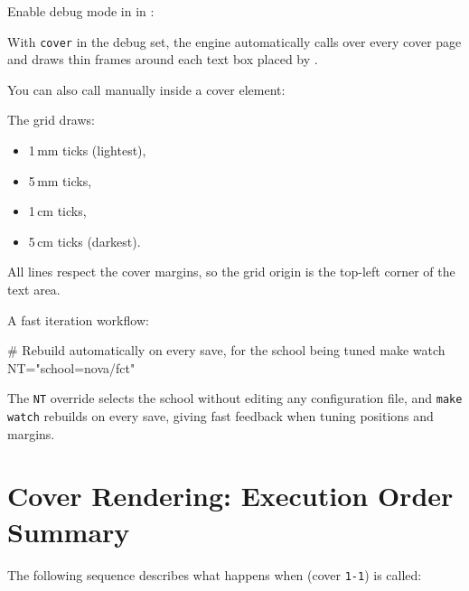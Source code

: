 Enable debug mode in \latexinline{\ntsetup} in :

\begin{latexcode}
\end{latexcode}

With \texttt{cover} in the debug set, the engine automatically calls
\latexinline{\debuggrid} over every cover page and draws thin frames around each
text box placed by \latexinline{\ntaddtocover}.

You can also call \latexinline{\debuggrid} manually inside a cover element:
\begin{latexcode}
\end{latexcode}

The grid draws:
\begin{itemize}
  \item 1\,mm ticks (lightest),
  \item 5\,mm ticks,
  \item 1\,cm ticks,
  \item 5\,cm ticks (darkest).
\end{itemize}

All lines respect the cover margins, so the grid origin is the top-left
corner of the text area.

\medskip
A fast iteration workflow:
\begin{bashcode}
# Rebuild automatically on every save, for the school being tuned
make watch NT="school=nova/fct"
\end{bashcode}

The \verb!NT! override selects the school without editing any configuration
file, and \verb!make watch! rebuilds on every save, giving fast feedback
when tuning positions and margins.


\section{Cover Rendering: Execution Order Summary}
\label{sec:covers_order}

The following sequence describes what happens when
 (cover \texttt{1-1}) is called:

